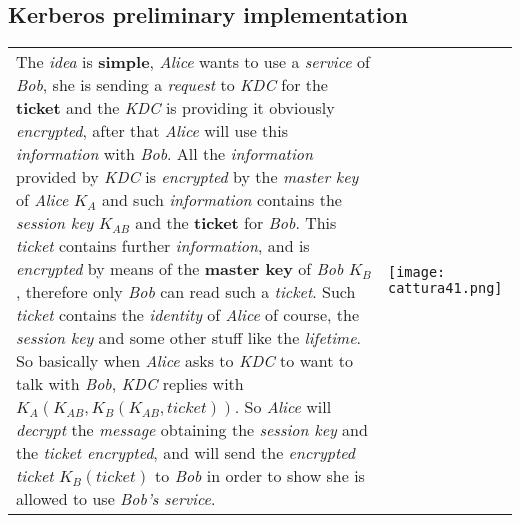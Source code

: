 \documentclass{article}
\begin{document}
\subsection{Kerberos preliminary implementation}
\begin{tabular}{C{10cm}  L{10.5cm}}
The \emph{idea} is \textbf{simple}, \emph{Alice} wants to use a \emph{service} of \emph{Bob}, she is sending a \emph{request} to \emph{KDC} for the \textbf{ticket} and the \emph{KDC} is providing it obviously \emph{encrypted}, after that \emph{Alice} will use this \emph{information} with \emph{Bob}. All the \emph{information} provided by \emph{KDC} is \emph{encrypted} by the \emph{master key} of \emph{Alice} $K_A$ and such \emph{information} contains the \emph{session key} $K_{AB}$ and the \textbf{ticket} for \emph{Bob}. This \emph{ticket} contains further \emph{information}, and is \emph{encrypted} by means of the \textbf{master key} of \emph{Bob} $K_B$, therefore only \emph{Bob} can read such a \emph{ticket}. Such \emph{ticket} contains the \emph{identity} of \emph{Alice} of course, the \emph{session key} and some other stuff like the \emph{lifetime}. So basically when \emph{Alice} asks to \emph{KDC} to want to talk with \emph{Bob}, \emph{KDC} replies with $K_A(K_{AB},K_B(K_{AB},ticket))$. So \emph{Alice} will \emph{decrypt} the \emph{message} obtaining the \emph{session key }and the \emph{ticket encrypted}, and will send the \emph{encrypted ticket} $K_B(ticket)$ to \emph{Bob} in order to show she is allowed to use \emph{Bob’s service}. &\texttt{[image: cattura41.png]}
\end{tabular}
\end{document}
